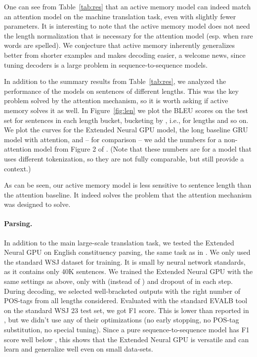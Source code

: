 \documentclass{article}
\begin{document}
One can see from Table~\ref{tab:res} that an active memory model
can indeed match an attention model on the machine translation task,
even with slightly fewer parameters. It is interesting to note that
the active memory model does not need the length normalization that
is necessary for the attention model (esp. when rare words are spelled).
We conjecture that active memory inherently generalizes better from shorter
examples and makes decoding easier, a welcome news, since tuning decoders
is a large problem in sequence-to-sequence models.

In addition to the summary results from Table~\ref{tab:res},
we analyzed the performance of the models on sentences of
different lengths. This was the key problem solved
by the attention mechanism, so it is worth asking if active memory
solves it as well.
In Figure~\ref{fig:len} we plot the BLEU scores on the test set
for sentences in each length bucket, bucketing by , i.e.,
for lengths  and so on. We plot the curves for
the Extended Neural GPU model, the long baseline GRU model with attention,
and -- for comparison -- we add the numbers for a non-attention
model from Figure 2 of \cite{bahdanau2014neural}. (Note that
these numbers are for a model that uses different tokenization,
so they are not fully comparable, but still provide a context.)

As can be seen, our active memory model is less sensitive to sentence
length than the attention baseline. It indeed solves
the problem that the attention mechanism was  designed to solve.

\paragraph{Parsing.}
In addition to the main large-scale translation task, we tested
the Extended Neural GPU on English constituency parsing, the same
task as in \cite{KVparse15}. We only used the standard WSJ dataset
for training. It is small by neural network standards, as it contains
only 40K sentences. We trained the Extended Neural GPU with the same
settings as above, only with  (instead of ) and
dropout of  in each step. During decoding, we selected
well-bracketed outputs with the right number of POS-tags from
all lengths considered. Evaluated with the standard EVALB tool
on the standard WSJ 23 test set, we got  F1 score. This is
lower than  reported in \cite{KVparse15}, but we didn't use
any of their optimizations (no early stopping, no POS-tag substitution,
no special tuning). Since a pure sequence-to-sequence model has F1
score well below , this shows that the Extended Neural GPU is
versatile and can learn and generalize well even on small data-sets.
\end{document}
